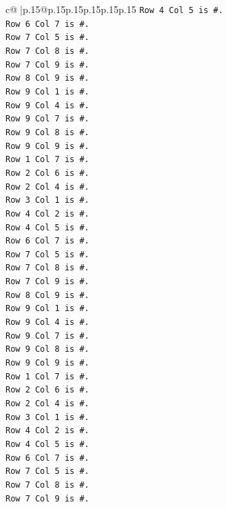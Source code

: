 \documentclass{article}
\begin{document}
{\begin{supertabular}{c@{$\;$}|p{.15\linewidth}@{}p{.15\linewidth}p{.15\linewidth}p{.15\linewidth}p{.15\linewidth}p{.15\linewidth}}
{{{\texttt{Row 4 Col 5 is \#.} \\
\texttt{Row 6 Col 7 is \#.} \\
\texttt{Row 7 Col 5 is \#.} \\
\texttt{Row 7 Col 8 is \#.} \\
\texttt{Row 7 Col 9 is \#.} \\
\texttt{Row 8 Col 9 is \#.} \\
\texttt{Row 9 Col 1 is \#.} \\
\texttt{Row 9 Col 4 is \#.} \\
\texttt{Row 9 Col 7 is \#.} \\
\texttt{Row 9 Col 8 is \#.} \\
\texttt{Row 9 Col 9 is \#.} \\
\texttt{Row 1 Col 7 is \#.} \\
\texttt{Row 2 Col 6 is \#.} \\
\texttt{Row 2 Col 4 is \#.} \\
\texttt{Row 3 Col 1 is \#.} \\
\texttt{Row 4 Col 2 is \#.} \\
\texttt{Row 4 Col 5 is \#.} \\
\texttt{Row 6 Col 7 is \#.} \\
\texttt{Row 7 Col 5 is \#.} \\
\texttt{Row 7 Col 8 is \#.} \\
\texttt{Row 7 Col 9 is \#.} \\
\texttt{Row 8 Col 9 is \#.} \\
\texttt{Row 9 Col 1 is \#.} \\
\texttt{Row 9 Col 4 is \#.} \\
\texttt{Row 9 Col 7 is \#.} \\
\texttt{Row 9 Col 8 is \#.} \\
\texttt{Row 9 Col 9 is \#.} \\
\texttt{Row 1 Col 7 is \#.} \\
\texttt{Row 2 Col 6 is \#.} \\
\texttt{Row 2 Col 4 is \#.} \\
\texttt{Row 3 Col 1 is \#.} \\
\texttt{Row 4 Col 2 is \#.} \\
\texttt{Row 4 Col 5 is \#.} \\
\texttt{Row 6 Col 7 is \#.} \\
\texttt{Row 7 Col 5 is \#.} \\
\texttt{Row 7 Col 8 is \#.} \\
\texttt{Row 7 Col 9 is \#.} \\
}}}
\end{supertabular}}
\end{document}
